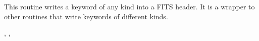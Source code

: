
\sloppy

 \section[add\_card]{ }
\label{sub:add_card}
\author{Frode K.~Hansen, Eric Hivon}

\begin{facility}
{This routine writes a keyword of any kind into a FITS header. It is a wrapper to other routines that write keywords of different kinds.}
{\modHeadFits}
\end{facility}

\begin{f90format}
{%
, %
, %
  }
\end{f90format}
\aboutoptional

